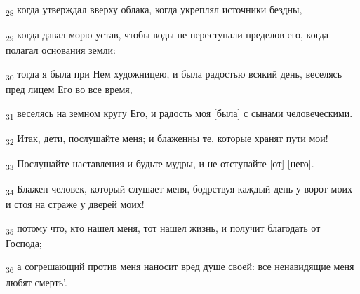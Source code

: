\begin{tcolorbox}
\textsubscript{28} когда утверждал вверху облака, когда укреплял источники бездны,
\end{tcolorbox}
\begin{tcolorbox}
\textsubscript{29} когда давал морю устав, чтобы воды не переступали пределов его, когда полагал основания земли:
\end{tcolorbox}
\begin{tcolorbox}
\textsubscript{30} тогда я была при Нем художницею, и была радостью всякий день, веселясь пред лицем Его во все время,
\end{tcolorbox}
\begin{tcolorbox}
\textsubscript{31} веселясь на земном кругу Его, и радость моя [была] с сынами человеческими.
\end{tcolorbox}
\begin{tcolorbox}
\textsubscript{32} Итак, дети, послушайте меня; и блаженны те, которые хранят пути мои!
\end{tcolorbox}
\begin{tcolorbox}
\textsubscript{33} Послушайте наставления и будьте мудры, и не отступайте [от] [него].
\end{tcolorbox}
\begin{tcolorbox}
\textsubscript{34} Блажен человек, который слушает меня, бодрствуя каждый день у ворот моих и стоя на страже у дверей моих!
\end{tcolorbox}
\begin{tcolorbox}
\textsubscript{35} потому что, кто нашел меня, тот нашел жизнь, и получит благодать от Господа;
\end{tcolorbox}
\begin{tcolorbox}
\textsubscript{36} а согрешающий против меня наносит вред душе своей: все ненавидящие меня любят смерть'.
\end{tcolorbox}
